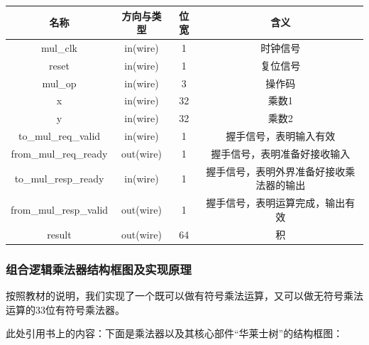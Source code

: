 \documentclass[11pt]{article}
\begin{document}
\begin{table}[H]
    \centering
    \begin{tabular}{cccc}\hline
        名称                & 方向与类型 & 位宽 & 含义                                    \\ \hline
        mul_clk             & in(wire)   & 1    & 时钟信号                                \\
        reset               & in(wire)   & 1    & 复位信号                                \\ \hline
        mul_op              & in(wire)   & 3    & 操作码                                  \\
        x                   & in(wire)   & 32   & 乘数1                                   \\
        y                   & in(wire)   & 32   & 乘数2                                   \\\hline
        to_mul_req_valid    & in(wire)   & 1    & 握手信号，表明输入有效                  \\
        from_mul_req_ready  & out(wire)  & 1    & 握手信号，表明准备好接收输入            \\
        to_mul_resp_ready   & in(wire)   & 1    & 握手信号，表明外界准备好接收乘法器的输出\\
        from_mul_resp_valid & out(wire)  & 1    & 握手信号，表明运算完成，输出有效        \\ \hline
        result              & out(wire)  & 64   & 积                                      \\ \hline
    \end{tabular}
\end{table}

\subsubsection{组合逻辑乘法器结构框图及实现原理}

按照教材的说明，我们实现了一个既可以做有符号乘法运算，又可以做无符号乘法运算的33位有符号乘法器。

此处引用书上的内容：下面是乘法器以及其核心部件“华莱士树”的结构框图：
\end{document}
